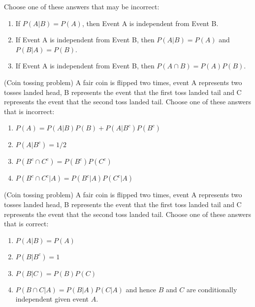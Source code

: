 \documentclass[poll_tutorial_format]{subfiles}
\begin{document}
\begin{exercise}
	Choose one of these answers that may be incorrect: %
	\begin{enumerate}
		\item If $P(A|B)=P(A)$, then Event A is independent from Event B.
		\item If Event A is independent from Event B, then $P(A|B)=P(A)$ and $P(B|A)=P(B)$.
		\item If Event A is independent from Event B, then $P(A\cap B)=P(A)P(B)$.
	\end{enumerate}
\end{exercise}


\begin{exercise}
	(Coin tossing problem) A fair coin is flipped two times, event A represents two tosses landed head, B represents the event that the first toss landed tail and C represents the event that the second toss landed tail. 
Choose one of these answers that is incorrect: %
\begin{enumerate}
		\item $P(A)=P(A|B)P(B)+P(A|B^c)P(B^c)$ %
		\item $P(A|B^c)=1/2$
		\item $P(B^c\cap C^c)=P(B^c)P(C^c)$ %
		\item $P(B^c\cap C^c|A)=P(B^c|A)P(C^c|A) $  
	\end{enumerate}
\end{exercise}

\begin{exercise}
	(Coin tossing problem) A fair coin is flipped two times, event A represents two tosses landed head, B represents the event that the first toss landed tail and C represents the event that the second toss landed tail. 
	Choose one of these answers that is correct: %
	\begin{enumerate}
		\item $P(A|B)=P(A)$  
		\item $P(B|B^c)=1$
		\item $P(B| C)=P(B)P(C)$  
		\item $P(B\cap C|A)=P(B|A)P(C|A)$ and hence $B$ and $C$ are conditionally independent given event $A$.  
	\end{enumerate}
\end{exercise}
\end{document}
